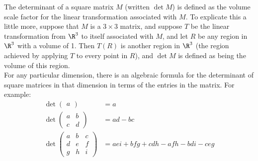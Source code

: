  \vspace{0.2cm}


The determinant of a square matrix $M$ (written $\det M$) is defined as the volume scale factor for the linear transformation associated with $M$. To explicate this a little more, suppose that $M$ is a $3 \times 3$ matrix, and suppose $T$ be the linear transformation from $\R^3$ to itself associated with $M$, and let $R$ be any region in $\R^3$ with a volume of 1. Then $T(R)$ is another region in $\R^3$ (the region achieved by applying $T$ to every point in $R$), and $\det M$ is defined as being the volume of this region. \\

For any particular dimension, there is an algebraic formula for the determinant of square matrices in that dimension in terms of the entries in the matrix. For example:
\[
\begin{split}
\det \begin{pmatrix} a \end{pmatrix}&=a \\
\det \begin{pmatrix} a & b \\ c & d  \end{pmatrix}&= ad-bc \\
\det \begin{pmatrix} a & b & c \\ d & e & f \\ g & h & i \end{pmatrix}&= aei+bfg+cdh-afh-bdi-ceg
\end{split}
\]

